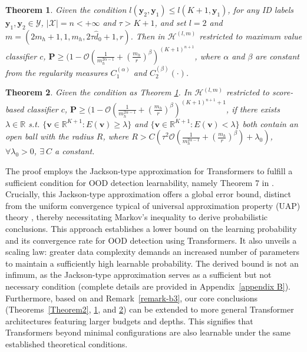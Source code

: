 \documentclass{article}
\theoremstyle{plain}
\newtheorem{theorem}{Theorem}[section]
\theoremstyle{definition}
\theoremstyle{remark}
\begin{document}
\begin{theorem}
    Given the condition $l(\mathbf{y}_2, \mathbf{y}_1) \leq l(K + 1, \mathbf{y}_1)$, for any ID labels $\mathbf{y}_1, \mathbf{y}_2 \in \mathcal{Y}$,  $|\mathcal{X}|=n<+\infty$ and  $\tau>K+1$, and set $l=2$ and $m=(2m_h+1,1,m_h,2\tau \hat{d}_0+1,r)$. Then in $\mathcal{H}^{(l,m)}$ restricted to maximum value classifier $c$, 
    $\mathbf{P}\geq (1-\mathcal{O}(\frac{1}{m_h^{2\alpha-1}}+(\frac{m_h}{r})^{\beta})^{(K+1)^{n+1}}$, where $\alpha$ and $\beta$ are constant from the regularity measures $C_1^{(\alpha)}$ and  $C_2^{(\beta)}(\cdot)$.
    \label{Theorem: Jackson-max}
\end{theorem}
\begin{theorem}
    Given the condition as Theorem \ref{Theorem: Jackson-max}. In $\mathcal{H}^{(l,m)}$ restricted to score-based classifier $c$, $\mathbf{P}\geq (1-\mathcal{O}(\frac{1}{m_h^{2\alpha-1}}+(\frac{m_h}{r})^{\beta})^{(K+1)^{n+1}+1}$, if there exists $\lambda\in \mathbb{R}$ \textit{s.t.} $\{\mathbf{v}\in \mathbb{R}^{K+1}:E(\mathbf{v})\geq \lambda\}$ and $\{\mathbf{v}\in \mathbb{R}^{K+1}:E(\mathbf{v})< \lambda\}$ both contain an open ball with the radius $R$, where $R>C(\tau^2\mathcal{O}(\frac{1}{m_h^{2\alpha-1}}+(\frac{m_h}{r})^{\beta}) + \lambda_0)$, $\forall\lambda_0>0$, $\exists~ C$ a constant.
    \label{Theorem: Jackson-score}
\end{theorem}
The proof employs the Jackson-type approximation for Transformers \citep{jiang2023approximation} to fulfill a sufficient condition for OOD detection learnability, namely Theorem 7 in \citet{fang2022out}. Crucially, this Jackson-type approximation offers a global error bound, distinct from the uniform convergence typical of universal approximation property (UAP) theory \citep{jiang2023approximation}, thereby necessitating Markov's inequality to derive probabilistic conclusions. This approach establishes a lower bound on the learning probability and its convergence rate for OOD detection using Transformers. It also unveils a scaling law: greater data complexity demands an increased number of parameters to maintain a sufficiently high learnable probability.
%
The derived bound is not an infimum, as the Jackson-type approximation serves as a sufficient but not necessary condition (complete details are provided in Appendix~\ref{appendix B}). Furthermore, based on \citet{yun2019transformers} and Remark~\ref{remark-b3}, our core conclusions (Theorems~\ref{Theorem2}, \ref{Theorem: Jackson-max}, and \ref{Theorem: Jackson-score}) can be extended to more general Transformer architectures featuring larger budgets and depths. This signifies that Transformers beyond minimal configurations are also learnable under the same established theoretical conditions.
\end{document}
